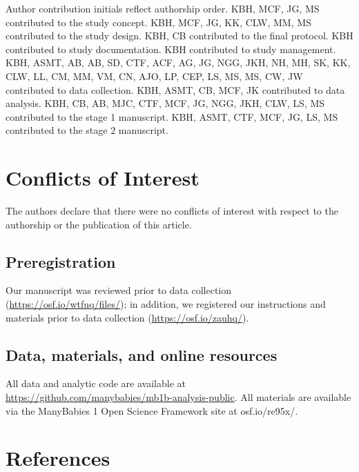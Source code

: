 \documentclass[,man,floatsintext]{apa6}
\begin{document}
Author contribution initials reflect authorship order. KBH, MCF, JG, MS contributed to the study concept. KBH, MCF, JG, KK, CLW, MM, MS contributed to the study design. KBH, CB contributed to the final protocol. KBH contributed to study documentation. KBH contributed to study management. KBH, ASMT, AB, AB, SD, CTF, ACF, AG, JG, NGG, JKH, NH, MH, SK, KK, CLW, LL, CM, MM, VM, CN, AJO, LP, CEP, LS, MS, MS, CW, JW contributed to data collection. KBH, ASMT, CB, MCF, JK contributed to data analysis. KBH, CB, AB, MJC, CTF, MCF, JG, NGG, JKH, CLW, LS, MS contributed to the stage 1 manuscript. KBH, ASMT, CTF, MCF, JG, LS, MS contributed to the stage 2 manuscript.

\hypertarget{conflicts-of-interest}{%
\section{Conflicts of Interest}\label{conflicts-of-interest}}

The authors declare that there were no conflicts of interest with respect to the authorship or the publication of this article.

\hypertarget{preregistration}{%
\subsection{Preregistration}\label{preregistration}}

Our manuscript was reviewed prior to data collection (\url{https://osf.io/wtfuq/files/}); in addition, we registered our instructions and materials prior to data collection (\url{https://osf.io/zauhq/}).

\hypertarget{data-materials-and-online-resources}{%
\subsection{Data, materials, and online resources}\label{data-materials-and-online-resources}}

All data and analytic code are available at \url{https://github.com/manybabies/mb1b-analysis-public}. All materials are available via the ManyBabies 1 Open Science Framework site at osf.io/re95x/.

\newpage

\hypertarget{references}{%
\section{References}\label{references}}
\end{document}

